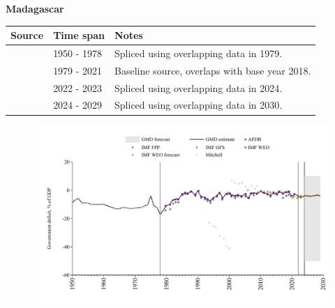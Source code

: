 \documentclass[12pt,a4paper,landscape]{article}
\begin{document}
\begin{adjustbox}{max totalsize={\paperwidth}{\paperheight},center}
\begin{minipage}[t][\textheight][t]{\textwidth}
\vspace*{0.5cm}
{}
\begin{center}
{\Large\bfseries Madagascar}
\end{center}
\vspace{0.5cm}
\begin{table}[H]
\centering
\small
\begin{tabular}{|l|l|l|}
\hline
\textbf{Source} & \textbf{Time span} & \textbf{Notes} \\
\hline
\rowcolor{white}\cite{Mitchell}& 1950 - 1978 &Spliced using overlapping data in 1979.\\
\rowcolor{lightgray}\cite{IMF_WEO}& 1979 - 2021 &Baseline source, overlaps with base year 2018.\\
\rowcolor{white}\cite{IMF_GFS}& 2022 - 2023 &Spliced using overlapping data in 2024.\\
\rowcolor{lightgray}\cite{IMF_WEO_forecast}& 2024 - 2029 &Spliced using overlapping data in 2030.\\
\hline
\end{tabular}
\end{table}
\begin{figure}[H]
\centering
\includegraphics[width=\textwidth,height=0.6\textheight,keepaspectratio]{graphs/MDG_govdef_GDP.pdf}
\end{figure}
\end{minipage}
\end{adjustbox}
\end{document}

